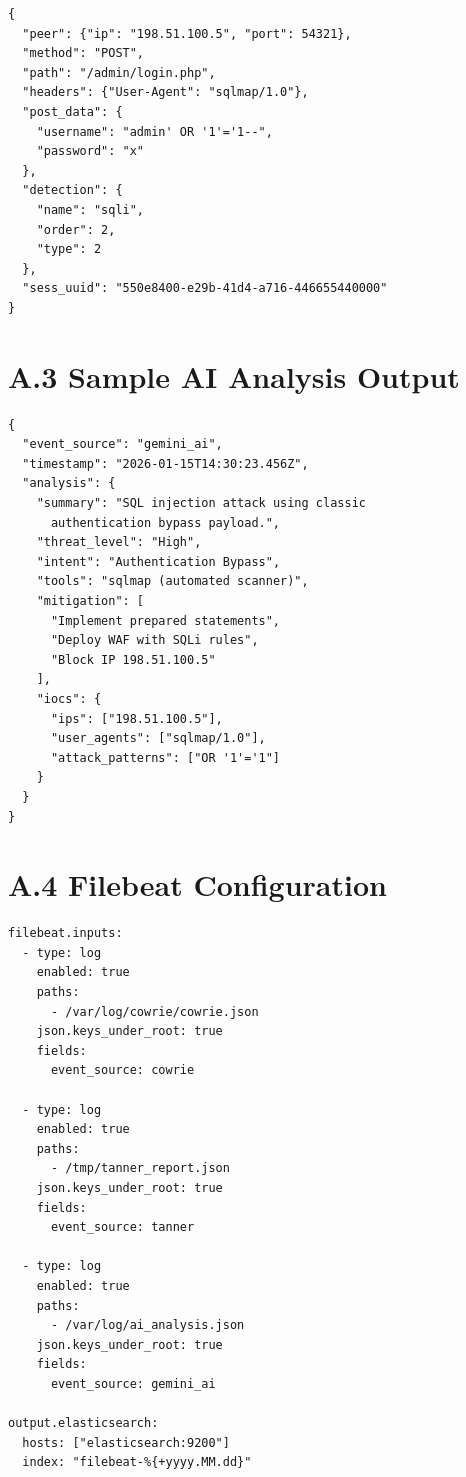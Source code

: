 \documentclass[12pt,a4paper]{report}
\begin{document}
\begin{lstlisting}[caption=Tanner JSON Log Sample]
{
  "peer": {"ip": "198.51.100.5", "port": 54321},
  "method": "POST",
  "path": "/admin/login.php",
  "headers": {"User-Agent": "sqlmap/1.0"},
  "post_data": {
    "username": "admin' OR '1'='1--",
    "password": "x"
  },
  "detection": {
    "name": "sqli",
    "order": 2,
    "type": 2
  },
  "sess_uuid": "550e8400-e29b-41d4-a716-446655440000"
}
\end{lstlisting}

\section*{A.3 Sample AI Analysis Output}

\begin{lstlisting}[caption=AI Analysis JSON Output]
{
  "event_source": "gemini_ai",
  "timestamp": "2026-01-15T14:30:23.456Z",
  "analysis": {
    "summary": "SQL injection attack using classic 
      authentication bypass payload.",
    "threat_level": "High",
    "intent": "Authentication Bypass",
    "tools": "sqlmap (automated scanner)",
    "mitigation": [
      "Implement prepared statements",
      "Deploy WAF with SQLi rules",
      "Block IP 198.51.100.5"
    ],
    "iocs": {
      "ips": ["198.51.100.5"],
      "user_agents": ["sqlmap/1.0"],
      "attack_patterns": ["OR '1'='1"]
    }
  }
}
\end{lstlisting}

\section*{A.4 Filebeat Configuration}

\begin{lstlisting}[caption=Filebeat Configuration (filebeat.yml)]
filebeat.inputs:
  - type: log
    enabled: true
    paths:
      - /var/log/cowrie/cowrie.json
    json.keys_under_root: true
    fields:
      event_source: cowrie

  - type: log
    enabled: true
    paths:
      - /tmp/tanner_report.json
    json.keys_under_root: true
    fields:
      event_source: tanner

  - type: log
    enabled: true
    paths:
      - /var/log/ai_analysis.json
    json.keys_under_root: true
    fields:
      event_source: gemini_ai

output.elasticsearch:
  hosts: ["elasticsearch:9200"]
  index: "filebeat-%{+yyyy.MM.dd}"
\end{lstlisting}
\end{document}
